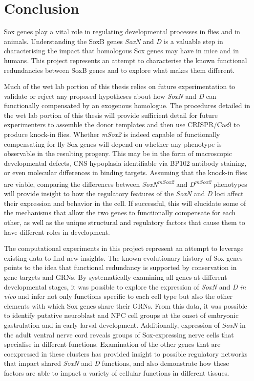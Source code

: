 \documentclass[withindex,glossary]{cam-thesis}
\begin{document}
\chapter{Conclusion}

Sox genes play a vital role in regulating developmental processes in
flies and in animals. Understanding the SoxB genes \emph{SoxN} and
\emph{D} is a valuable step in characterising the impact that homologous
Sox genes may have in mice and in humans. This project represents an
attempt to characterise the known functional redundancies between SoxB
genes and to explore what makes them different.

Much of the wet lab portion of this thesis relies on future
experimentation to validate or reject any proposed hypotheses about how
\emph{SoxN} and \emph{D} can functionally compensated by an exogenous
homologue. The procedures detailed in the wet lab portion of this thesis
will provide sufficient detail for future experimenters to assemble the
donor templates and then use CRISPR/Cas9 to produce knock-in flies.
Whether \emph{mSox2} is indeed capable of functionally compensating for
fly Sox genes will depend on whether any phenotype is observable in the
resulting progeny. This may be in the form of macroscopic developmental
defects, CNS hypoplasia identifiable via BP102 antibody staining, or
even molecular differences in binding targets. Assuming that the
knock-in flies are viable, comparing the differences between
\emph{SoxN\textsuperscript{mSox2}} and \emph{D\textsuperscript{mSox2}}
phenotypes will provide insight to how the regulatory features of the
\emph{SoxN} and \emph{D} loci affect their expression and behavior in
the cell. If successful, this will elucidate some of the mechanisms that
allow the two genes to functionally compensate for each other, as well
as the unique structural and regulatory factors that cause them to have
different roles in development.

The computational experiments in this project represent an attempt to
leverage existing data to find new insights. The known evolutionary
history of Sox genes points to the idea that functional redundancy is
supported by conservation in gene targets and GRNs. By systematically
examining all genes at different developmental stages, it was possible
to explore the expression of \emph{SoxN} and \emph{D} \emph{in vivo} and
infer not only functions specific to each cell type but also the other
elements with which Sox genes share their GRNs. From this data, it was
possible to identify putative neuroblast and NPC cell groups at the
onset of embryonic gastrulation and in early larval development.
Additionally, expression of \emph{SoxN} in the adult ventral nerve cord
reveals groups of Sox-expressing nerve cells that specialise in
different functions. Examination of the other genes that are coexpressed
in these clusters has provided insight to possible regulatory networks
that impact shared \emph{SoxN} and \emph{D} functions, and also
demonstrate how these factors are able to impact a variety of cellular
functions in different tissues.
\end{document}
